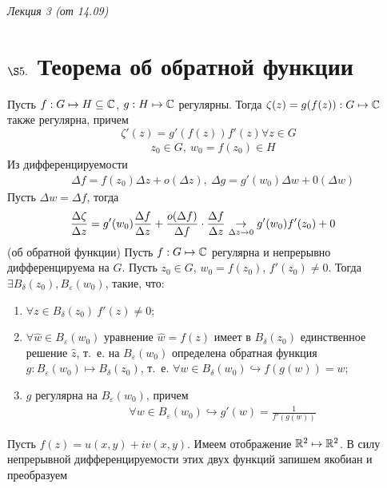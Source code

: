 \begin{flushright}
    \textit{Лекция 3 (от 14.09)}
\end{flushright}
\section{$\S 5.$ Теорема об обратной функции}
\theorem
Пусть $f: G \mapsto H \subseteq \mathbb{C}$, $g: H \mapsto \mathbb{C}$ регулярны.
Тогда $\zeta(z) = g(f(z)): G \mapsto \mathbb{C}$ также регулярна, причем
\begin{equation}\label{(3.1)}
    \zeta'(z) = g'(f(z))f'(z) \forall z \in G
\end{equation}
\pr
\begin{align*}
  & z_0 \in G, \ w_0 = f(z_0) \in H
\end{align*}
Из дифференцируемости
\begin{align*}
  & \Delta f = f(z_0)\Delta z + o(\Delta z), \ \Delta g = g'(w_0) \Delta w + 0(\Delta w)
\end{align*}
Пусть $\Delta w = \Delta f$, тогда
\begin{align*}
  & \frac{\Delta \zeta}{\Delta z} = g'(w_0) \frac{\Delta f}{\Delta z} + \frac{o(\Delta f)}{\Delta f} \cdot \frac{\Delta f}{\Delta z} \underset{\Delta z \to 0}{\to} g'(w_0)f'(z_0) + 0
\end{align*}
\theorem (об обратной функции)
Пусть $f: G \mapsto \mathbb{C}$ регулярна и непрерывно дифференцируема на $G$. Пусть
$z_0 \in G$, $w_0 = f(z_0)$, $f'(z_0) \neq 0$. Тогда $\exists B_\delta(z_0),
B_\varepsilon(w_0)$, такие, что:
\begin{enumerate}
    \item $\forall z \in B_\delta(z_0) \ f'(z) \neq 0$;
    \item $\forall \hat{w} \in B_\varepsilon(w_0)$ уравнение $\hat{w} = f(z)$
    имеет в $B_\delta(z_0)$ единственное решение $\hat{z}$, т.~е. на
    $B_\varepsilon(w_0)$ определена обратная функция $g: B_\varepsilon(w_0)
    \mapsto B_\delta(z_0)$, т.~е. $\forall w \in B_\delta(w_0) \hookrightarrow
    f(g(w)) = w$;
    \item $g$ регулярна на $B_\varepsilon(w_0)$, причем
    \begin{align*}
      & \forall w \in B_\varepsilon(w_0) \hookrightarrow g'(w) = \frac{1}{f'(g(w))}
    \end{align*}
\end{enumerate}
\pr
Пусть $f(z) = u(x,y) +iv(x,y)$. Имеем отображение $\mathbb{R}^2 \mapsto \mathbb{R}^2$. В силу
непрерывной дифференцируемости этих двух функций запишем якобиан и преобразуем

